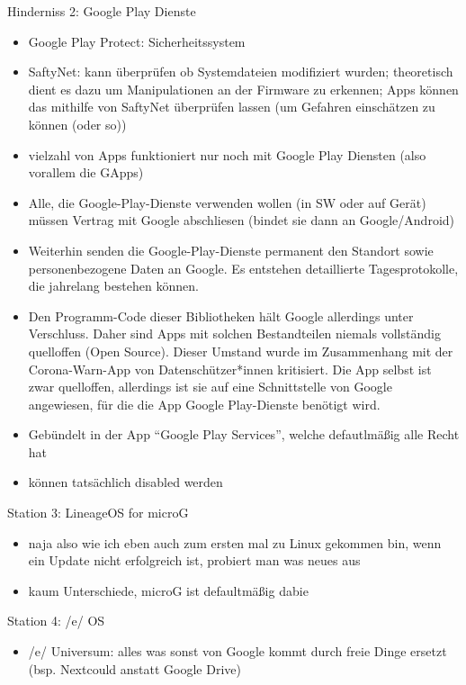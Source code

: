 \documentclass[14pt,compress,usenames,dvipsnames,aspectratio=169]{beamer}
\begin{document}
\begin{frame}{Hinderniss 2: Google Play Dienste}
{\begin{itemize}
            \item Google Play Protect: Sicherheitssystem
            \item SaftyNet: kann überprüfen ob Systemdateien modifiziert wurden; theoretisch dient es dazu um Manipulationen an der Firmware zu erkennen; Apps können das mithilfe von SaftyNet überprüfen lassen (um Gefahren einschätzen zu können (oder so))
            \item vielzahl von Apps funktioniert nur noch mit Google Play Diensten (also vorallem die GApps)
            \item Alle, die Google-Play-Dienste verwenden wollen (in SW oder auf Gerät) müssen Vertrag mit Google abschliesen (bindet sie dann an Google/Android)
            \item Weiterhin senden die Google-Play-Dienste permanent den Standort sowie personenbezogene Daten an Google. Es entstehen detaillierte Tagesprotokolle, die jahrelang bestehen können.
            \item Den Programm-Code dieser Bibliotheken hält Google allerdings unter Verschluss. Daher sind Apps mit solchen Bestandteilen niemals vollständig quelloffen (Open Source). Dieser Umstand wurde im Zusammenhang mit der Corona-Warn-App von Datenschützer*innen kritisiert. Die App selbst ist zwar quelloffen, allerdings ist sie auf eine Schnittstelle von Google angewiesen, für die die App Google Play-Dienste benötigt wird.
            \item Gebündelt in der App “Google Play Services”, welche defautlmäßig alle Recht hat
            \item können tatsächlich disabled werden
        \end{itemize}
    }

\end{frame}

\begin{frame}{Station 3: LineageOS for microG}
    \begin{itemize}
        \item naja also wie ich eben auch zum ersten mal zu Linux gekommen bin, wenn ein Update nicht erfolgreich ist, probiert man was neues aus
        \item kaum Unterschiede, microG ist defaultmäßig dabie
    \end{itemize}

\end{frame}

\begin{frame}{Station 4: /e/ OS}
    \begin{itemize}
        \item /e/ Universum: alles was sonst von Google kommt durch freie Dinge ersetzt (bsp. Nextcould anstatt Google Drive)
    \end{itemize}

\end{frame}
\end{document}
